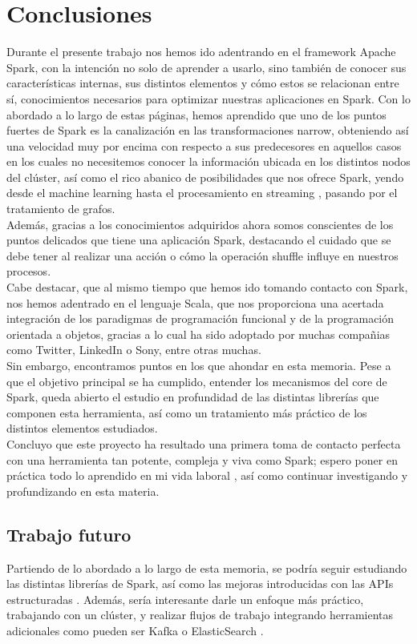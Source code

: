 \chapter{Conclusiones}

Durante el presente trabajo nos hemos ido adentrando en el framework Apache Spark, con la intención no solo de aprender a usarlo, sino también de conocer sus características internas, sus distintos elementos y cómo estos se relacionan entre sí, conocimientos necesarios para optimizar nuestras aplicaciones en Spark. Con lo abordado a lo largo de  estas páginas, hemos aprendido que uno de los puntos fuertes de Spark es la canalización en las transformaciones narrow, obteniendo así una velocidad muy por encima con respecto a sus predecesores en aquellos casos en los cuales no necesitemos conocer la información ubicada en los distintos nodos del clúster, así como el rico abanico de posibilidades que nos ofrece Spark, yendo desde el machine learning hasta el procesamiento en streaming , pasando por el tratamiento de grafos. \\

Además, gracias a los conocimientos adquiridos ahora somos conscientes de los puntos delicados que tiene una aplicación Spark, destacando el cuidado que se debe tener al realizar una acción o cómo la operación shuffle influye en nuestros procesos.\\

Cabe destacar, que al mismo tiempo que hemos ido tomando contacto con Spark, nos hemos adentrado en el lenguaje Scala, que nos proporciona una acertada integración de los paradigmas de programación funcional y de la programación orientada a objetos, gracias a lo cual ha sido adoptado por muchas compañias como Twitter, LinkedIn o Sony, entre otras muchas.\\

Sin embargo, encontramos puntos en los que ahondar en esta memoria. Pese a que el objetivo principal se ha cumplido, entender los mecanismos del core de Spark, queda abierto el estudio en profundidad de las distintas librerías que componen esta herramienta, así como un tratamiento más práctico de los distintos elementos estudiados.\\

Concluyo que este proyecto ha resultado una primera toma de contacto perfecta con una herramienta tan potente, compleja y viva como Spark; espero poner en práctica todo lo aprendido en mi vida laboral , así como continuar investigando y profundizando en esta materia.\\

\section{Trabajo futuro}

Partiendo de lo abordado a lo largo de esta memoria, se podría seguir estudiando las distintas librerías de Spark, así como las mejoras introducidas con las APIs estructuradas \cite{9Catalyst} \cite{9DDCatalyst}. Además, sería interesante darle un enfoque más práctico, trabajando con un clúster, y realizar flujos de trabajo integrando herramientas adicionales como pueden ser Kafka \cite{9kafka} o ElasticSearch \cite{9elasticsearch}.

